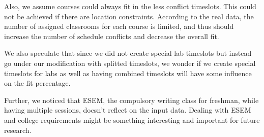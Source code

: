 \documentclass[11pt, oneside]{article}   	%
\begin{document}
Also, we assume courses could always fit in the less conflict timeslots. This could not be achieved if there are location constraints. According to the real data, the number of assigned classrooms for each course is limited, and thus should increase the number of schedule conflicts and decrease the overall fit.

We also speculate that since we did not create special lab timeslots but instead go under our modification with splitted timeslots, we wonder if we create special timeslots for labs as well as having combined timeslots will have some influence on the fit percentage. 

Further, we noticed that ESEM, the compulsory writing class for freshman, while having multiple sessions, doesn't reflect on the input data. Dealing with ESEM and college requirements might be something interesting and important for future research.


    
    
    
\end{document}

